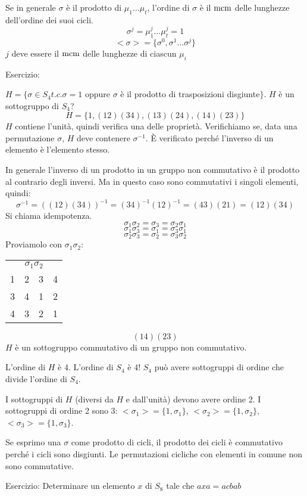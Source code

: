 Se in generale $\sigma$ \`e il prodotto di $\mu_1 \dots \mu_t$, l'ordine di $\sigma$ \`e il $\operatorname{mcm}$ delle lunghezze dell'ordine dei suoi cicli.
\[
\sigma^j = \mu_1^j \dots \mu_t^j = 1
\]
\[
< \sigma > = \{ \sigma^0, \sigma^1 \dots \sigma^j \}
\]
$j$ deve essere il $\operatorname{mcm}$ delle lunghezze di ciascun $\mu_i$

Esercizio:

$H = \{ \sigma \in S_4 t.c. \sigma = 1$ oppure $\sigma$ \`e il prodotto di trasposizioni disgiunte$\}$. $H$ \`e un sottogruppo di $S_4$?
\[
H = \{ 1, (1 2) (3 4), (1 3) (2 4), (1 4) (2 3) \}
\]
$H$ contiene l'unit\`a, quindi verifica una delle propriet\`a. Verifichiamo se, data una permutazione $\sigma$, $H$ deve contenere $\sigma^{-1}$. \`E verificato perch\'e l'inverso di un elemento \`e l'elemento stesso.

In generale l'inverso di un prodotto in un gruppo non commutativo \`e il prodotto al contrario degli inversi. Ma in questo caso sono commutativi i singoli elementi, quindi:
\[
\sigma^{-1} = ((1 2) (3 4) )^{-1} = (3 4)^{-1} (1 2)^{-1} = (4 3) (2 1) = (1 2) (3 4)
\]
Si chiama idempotenza.
\[
\sigma_1 \sigma_2 = \sigma_3 = \sigma_2 \sigma_1
\]
\[
\sigma_1 \sigma_3 = \sigma_1 = \sigma_3 \sigma_1
\]
\[
\sigma_2 \sigma_3 = \sigma_2 = \sigma_3 \sigma_2
\]
Proviamolo con $\sigma_1 \sigma_2$:

\begin{tabular}{*{4}{c}}
\multicolumn{4}{c}{$\sigma_1 \sigma_2$} \\
1 & 2 & 3 & 4 \\
3 & 4 & 1 & 2 \\
4 & 3 & 2 & 1
\end{tabular}
\[
(1 4) (2 3)
\]
$H$ \`e un sottogruppo commutativo di un gruppo non commutativo.

L'ordine di $H$ \`e 4. L'ordine di $S_4$ \`e $4!$ $S_4$ pu\`o avere sottogruppi di ordine che divide l'ordine di $S_4$.

I sottogruppi di $H$ (diversi da $H$ e dall'unit\`a) devono avere ordine 2. I sottogruppi di ordine 2 sono 3: $< \sigma_1 > = \{ 1, \sigma_1\}$, $< \sigma_2 > = \{1, \sigma_2\}$, $< \sigma_3 > = \{1, \sigma_3 \}$.

Se esprimo una $\sigma$ come prodotto di cicli, il prodotto dei cicli \`e commutativo perch\'e i cicli sono disgiunti. Le permutazioni cicliche con elementi in comune non sono commutative.

Esercizio:
Determinare un elemento $x$ di $S_8$ tale che $a x a = a c b a b$

